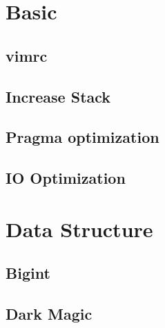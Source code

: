 \documentclass[a4paper,10pt,twocolumn,oneside]{article}
\begin{document}
\pagestyle{fancy}
\fancyfoot{}
\fancyhead[R]{\thepage}
\renewcommand{\headrulewidth}{0.4pt}
\renewcommand{\contentsname}{Contents} 

\scriptsize
\tableofcontents

\section{Basic}
\subsection{vimrc}

\subsection{Increase Stack}

\subsection{Pragma optimization}

% 
% 
\subsection{IO Optimization}


\section{Data Structure}
\subsection{Bigint}

\subsection{Dark Magic}

\end{document}
